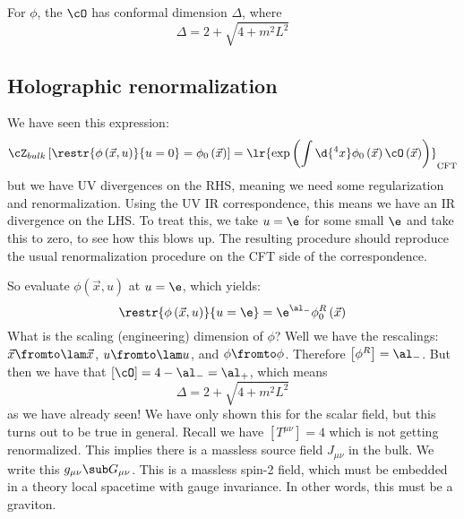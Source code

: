 \documentclass{booc}
\begin{document}
For $\phi$, the $\cO$ has conformal dimension $\Delta$, where
\begin{equation}
\Delta = 2 + \sqrt{4 + m^2 L^2}
\end{equation}

\subsection{Holographic renormalization}

We have seen this expression:
\begin{equation}
\cZ_{bulk}\left[ \restr{\phi\left( \vec{x} , u \right)}{u = 0} = 
\phi_0\left( \vec{x} \right) \right] = \lr{\exp\left( \int \d{^4 x} \phi_0\left( \vec{x}\right)
\cO\left( \vec{x} \right) \right)}_{\text{CFT}}
\end{equation}
but we have UV divergences on the RHS, meaning we need some regularization and renormalization.
Using the UV IR correspondence, this means we have an IR divergence on the LHS. 
To treat this, we take $u = \e$ for some small $\e$ and take this to zero, to see
how this blows up. The resulting procedure should reproduce the usual renormalization procedure
on the CFT side of the correspondence.

So evaluate $\phi\left( \vec{x} , u \right)$ at $u = \e$, which yields:
\begin{equation}
\restr{\phi\left( \vec{x} , u \right)}{u = \e} = 
\e^{\al_-} \phi_0^R\left( \vec{x} \right)
\end{equation}
What is the scaling (engineering) dimension of $\phi$?
Well we have the rescalings: $\vec{x}\fromto \lam \vec{x}$, 
$u\fromto \lam u$, and $\phi \fromto \phi$.
Therefore $\left[ \phi^R \right] = \al_-$.
But then we have that $\left[ \cO \right] = 4 - \al_- = \al_+$, 
which means
\begin{equation}
\Delta = 2 + \sqrt{4 + m^2 L^2}
\end{equation}
as we have already seen!
We have only shown this for the scalar field,
but this turns out to be true in general. 
Recall we have $\left[ T^{\mu\nu} \right] = 4$ which is not getting renormalized. 
This implies there is a massless source field $J_{\mu\nu}$ in the bulk.
We write this $g_{\mu\nu} \sub G_{\mu\nu}$. 
This is a massless spin-2 field, which must be embedded in a theory
local spacetime with gauge invariance. In other words, this must be a graviton.
\end{document}
